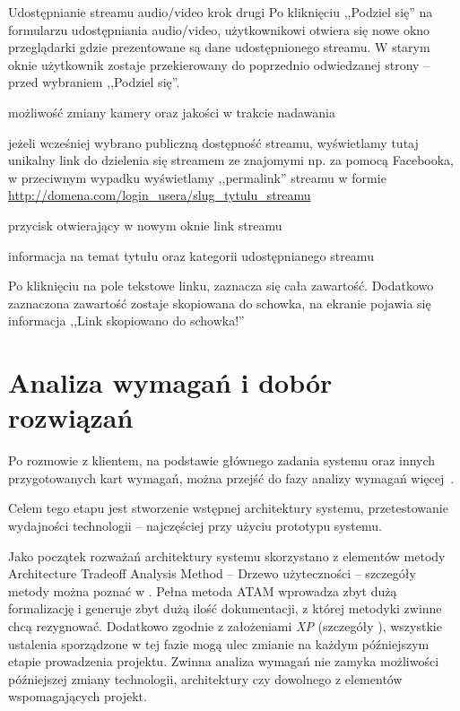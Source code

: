 \begin{userstory}{Udostępnianie streamu audio/video krok drugi}
    Po kliknięciu ,,Podziel się'' na formularzu udostępniania audio/video, użytkownikowi otwiera się nowe okno przeglądarki gdzie prezentowane są dane udostępnionego streamu. W starym oknie użytkownik zostaje przekierowany do poprzednio odwiedzanej strony -- przed wybraniem ,,Podziel się''.
    \begin{packed_enum}
        \item{możliwość zmiany kamery oraz jakości w trakcie nadawania}
        \item{jeżeli wcześniej wybrano publiczną dostępność streamu, wyświetlamy tutaj unikalny link do dzielenia się streamem ze znajomymi np. za pomocą Facebooka, w przeciwnym wypadku wyświetlamy ,,permalink'' streamu w formie \url{http://domena.com/login_usera/slug_tytulu_streamu}}
        \item{przycisk otwierający w nowym oknie link streamu}
        \item{informacja na temat tytułu oraz kategorii udostępnianego streamu}
    \end{packed_enum}
    \begin{tests}
        \item{Po kliknięciu na pole tekstowe linku, zaznacza się cała zawartość. Dodatkowo zaznaczona zawartość zostaje skopiowana do schowka, na ekranie pojawia się informacja ,,Link skopiowano do schowka!''}
    \end{tests}
\end{userstory}

\section{Analiza wymagań i dobór rozwiązań}
\label{sec:EtapIaw}

Po rozmowie z klientem, na podstawie głównego zadania systemu oraz innych przygotowanych kart wymagań, można przejść do fazy analizy wymagań więcej~.

Celem tego etapu jest stworzenie wstępnej architektury systemu, przetestowanie wydajności technologii -- najczęściej przy użyciu prototypu systemu.

Jako początek rozważań architektury systemu skorzystano z elementów metody Architecture Tradeoff Analysis Method -- Drzewo użyteczności -- szczegóły metody można poznać w \cite{Kaz2000}. Pełna metoda ATAM wprowadza zbyt dużą formalizację i generuje zbyt dużą ilość dokumentacji, z której metodyki zwinne chcą rezygnować. Dodatkowo zgodnie z założeniami \textit{XP} (szczegóły ), wszystkie ustalenia sporządzone w tej fazie mogą ulec zmianie na każdym późniejszym etapie prowadzenia projektu. Zwinna analiza wymagań nie zamyka możliwości późniejszej zmiany technologii, architektury czy dowolnego z elementów wspomagających projekt.

